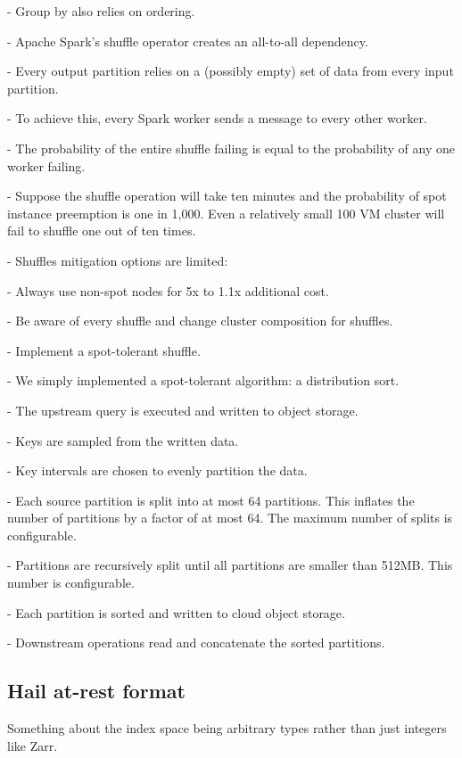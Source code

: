 \documentclass[10pt,a4paper%
]{article}
\begin{document}
    - Group by also relies on ordering.

    - Apache Spark’s shuffle operator creates an all-to-all dependency.

      - Every output partition relies on a (possibly empty) set of data from every input partition.

      - To achieve this, every Spark worker sends a message to every other worker.

      - The probability of the entire shuffle failing is equal to the probability of any one worker failing.

      - Suppose the shuffle operation will take ten minutes and the probability of spot instance preemption is one in 1,000. Even a relatively small 100 VM cluster will fail to shuffle one out of ten times.

      - Shuffles mitigation options are limited:

        - Always use non-spot nodes for 5x to 1.1x additional cost.

        - Be aware of every shuffle and change cluster composition for shuffles.

        - Implement a spot-tolerant shuffle.

    - We simply implemented a spot-tolerant algorithm: a distribution sort.

      - The upstream query is executed and written to object storage.

      - Keys are sampled from the written data.

      - Key intervals are chosen to evenly partition the data.

      - Each source partition is split into at most 64 partitions. This inflates the number of partitions by a factor of at most 64. The maximum number of splits is configurable.

      - Partitions are recursively split until all partitions are smaller than 512MB. This number is configurable.

      - Each partition is sorted and written to cloud object storage.

      - Downstream operations read and concatenate the sorted partitions.

\subsection{Hail at-rest format}

Something about the index space being arbitrary types rather than just integers like Zarr.
\end{document}
